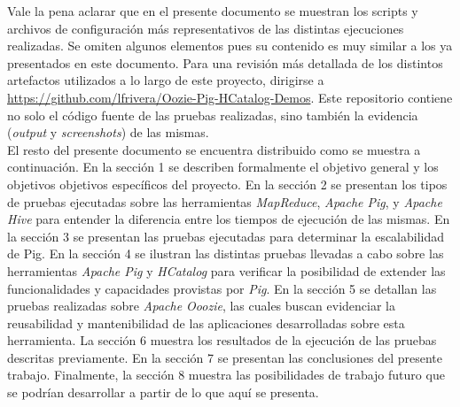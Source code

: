 Vale la pena aclarar que en el presente documento se muestran los scripts y archivos de configuración más representativos de las distintas ejecuciones realizadas. Se omiten algunos elementos pues su contenido es muy similar a los ya presentados en este documento. Para una revisión más detallada de los distintos artefactos utilizados a lo largo de este proyecto, dirigirse a \url{https://github.com/lfrivera/Oozie-Pig-HCatalog-Demos}. Este repositorio contiene no solo el código fuente de las pruebas realizadas, sino también la evidencia (\textit{output} y \textit{screenshots}) de las mismas. \\

El resto del presente documento se encuentra distribuido como se muestra a continuación. En la sección 1 se describen formalmente el objetivo general y los objetivos objetivos específicos del proyecto. En la sección 2 se presentan los tipos de pruebas ejecutadas sobre las herramientas \textit{MapReduce}, \textit{Apache Pig}, y \textit{Apache Hive} para entender la diferencia entre los tiempos de ejecución de las mismas. En la sección 3 se presentan las pruebas ejecutadas para determinar la escalabilidad de Pig. En la sección 4 se ilustran las distintas pruebas llevadas a cabo sobre las herramientas \textit{Apache Pig} y \textit{HCatalog} para verificar la posibilidad de extender las funcionalidades y capacidades provistas por \textit{Pig}. En la sección 5 se detallan las pruebas realizadas sobre \textit{Apache Ooozie}, las cuales buscan evidenciar la reusabilidad y mantenibilidad de las aplicaciones desarrolladas sobre esta herramienta. La sección 6 muestra los resultados de la ejecución de las pruebas descritas previamente. En la sección 7 se presentan las conclusiones del presente trabajo. Finalmente, la sección 8 muestra las posibilidades de trabajo futuro que se podrían desarrollar a partir de lo que aquí se presenta.